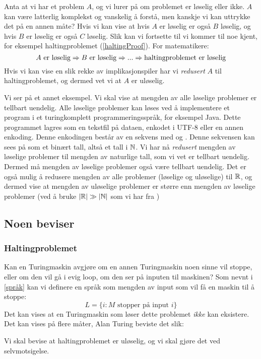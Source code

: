 Anta at vi har et problem $ A $, og vi lurer på om problemet er løselig eller ikke. $ A $ kan være latterlig komplekst og vanskelig å forstå, men kanskje vi kan uttrykke det på en annen måte? Hvis vi kan vise at hvis $ A $ er løselig er også $ B $ løselig, og hvis $ B $ er løselig er også $ C $ løselig. Slik kan vi fortsette til vi kommer til noe kjent, for eksempel haltingproblemet (\ref{haltingProof}). For matematikere:
\[ \text{$ A $ er løselig} \Rightarrow \text{$ B $ er løselig} \Rightarrow ... \Rightarrow \text{haltingproblemet er løselig} \]
Hvis vi kan vise en slik rekke av implikasjonspiler har vi \emph{redusert} $ A $ til haltingproblemet, og dermed vet vi at $ A $ er uløselig.

Vi ser på et annet eksempel. Vi skal vise at mengden av alle løselige problemer er tellbart uendelig. Alle løselige problemer kan løses ved å implementere et program i et turingkomplett programmeringsspråk, for eksempel Java. Dette programmet lagres som en tekstfil på dataen, enkodet i UTF-8 eller en annen enkoding. Denne enkodingen består av en sekvens med  og . Denne sekvensen kan sees på som et binært tall, altså et tall i $ \mathbb{N} $. Vi har nå \textit{redusert} mengden av løselige problemer til mengden av naturlige tall, som vi vet er tellbart uendelig. Dermed må mengden av løselige problemer også være tellbart uendelig. Det er også mulig å redusere mengden av alle problemer (løselige og uløselige) til $ \mathbb{R} $, og dermed vise at mengden av uløselige problemer er større enn mengden av løselige problemer (ved å bruke $ \left|\mathbb{R}\right| \gg \left|\mathbb{N}\right| $ som vi har fra )

\subsection{Noen beviser}
\subsubsection{Haltingproblemet}
Kan en Turingmaskin avgjøre om en annen Turingmaskin noen sinne vil stoppe, eller om den vil gå i evig loop, om den ser på inputen til maskinen? Som nevnt i \ref{språk} kan vi definere en språk som mengden av input som vil få en maskin til å stoppe:
\[ L = \{i : M \text{ stopper på input } i \} \]
Det kan vises at en Turingmaskin som løser dette problemet \emph{ikke} kan eksistere. Det kan vises på flere måter, Alan Turing beviste det slik:

\label{haltingProof}
Vi skal bevise at haltingproblemet er uløselig, og vi skal gjøre det ved selvmotsigelse. 

